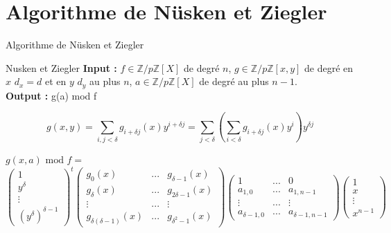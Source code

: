 \documentclass[10pt,a4paper]{beamer}
\begin{document}
\begin{frame}
\begin{columns}
\begin{figure}
            \end{figure}
    \end{columns}
\end{frame}


\section{Algorithme de Nüsken et Ziegler}
\begin{frame}{Algorithme de Nüsken et Ziegler}
    \begin{block}{Nusken et Ziegler}
        \textbf{Input :} $f \in \mathbb{Z}/p\mathbb{Z}[X]$ de degré $n$, $g \in \mathbb{Z}/p\mathbb{Z}[x,y]$ de degré en $x$ $d_x=d$ et en $y$ $d_y$ au plus $n$, $a \in \mathbb{Z}/p\mathbb{Z}[X]$ de degré au plus $n-1$. \\
        \textbf{Output :} g(a) mod f
    \end{block}

    \[
    g(x,y) = \sum_{i,j<\delta}g_{i+\delta j}(x)y^{i+\delta j} = \sum_{j<\delta} \left( \sum_{i<\delta} g_{i+\delta j}(x)y^i \right) y^{\delta j}     
    \]
    
    $g(x, a)\text{ mod }f =$
    \[
    \begin{pmatrix}
        1 \\
        y^\delta \\
        \vdots \\
        (y^\delta)^{\delta-1}  
    \end{pmatrix}^t
    \begin{pmatrix}
        g_0(x) & ... & g_{\delta-1}(x) \\
        g_{\delta}(x) & ... & g_{2\delta-1}(x) \\
        \vdots & ... & \vdots \\
        g_{\delta(\delta-1)}(x) & ... & g_{\delta^2-1}(x)
    \end{pmatrix}
    \begin{pmatrix}
        1 &  ... & 0 \\
        a_{1,0} & ... & a_{1,n-1} \\
        \vdots &  ... & \vdots \\
        a_{\delta-1,0} & ... & a_{\delta-1,n-1}
    \end{pmatrix}
    \begin{pmatrix}
        1 \\
        x \\
        \vdots \\
        x^{n-1}
    \end{pmatrix}
    \]
    
\end{frame}
\end{document}
